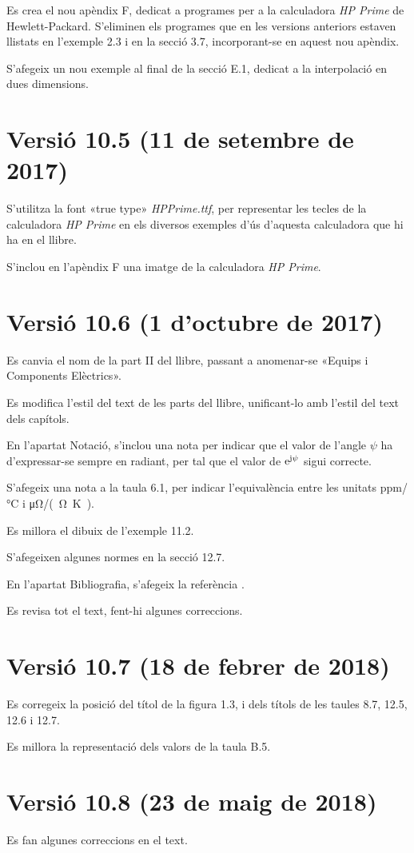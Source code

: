 Es crea el nou apèndix F, dedicat a programes per a la calculadora \emph{HP Prime} de Hewlett-Packard. S'eliminen els programes que en les versions anteriors estaven llistats en l'exemple 2.3 i en la secció 3.7, incorporant-se en aquest nou apèndix.

S'afegeix un nou exemple al final de la secció E.1, dedicat  a la interpolació en dues dimensions.

\section*{Versió 10.5 (11 de setembre de 2017)}

S'utilitza la font «true type» \emph{HPPrime.ttf}, per representar les tecles de la calculadora \emph{HP Prime} en els diversos exemples d'ús d'aquesta calculadora que hi ha en el llibre.

S'inclou en l'apèndix F una imatge de la calculadora \emph{HP Prime}.


\section*{Versió 10.6 (1 d'octubre de 2017)}

Es canvia el nom de la part II del llibre, passant a anomenar-se «Equips i Components Elèctrics».

Es modifica l'estil del text de les parts del llibre, unificant-lo amb l'estil del text dels capítols.

En l'apartat Notació, s'inclou una nota per indicar  que el valor de l'angle $\psi$ ha d'expressar-se sempre en radiant, per tal que el valor de $\mathrm{e}^{\mathrm{j}\psi}$ sigui correcte.

S'afegeix una nota a la taula 6.1, per indicar l'equivalència entre les unitats \si{ppm/\degreeCelsius}  i  \si{\micro\ohm/(\ohm.\kelvin)}.

Es millora el dibuix de l'exemple 11.2.

S’afegeixen algunes normes en la secció 12.7.

En l'apartat Bibliografia, s'afegeix la referència \cite{BUR}.

Es revisa tot el text, fent-hi algunes correccions.


\section*{Versió 10.7 (18 de febrer de 2018)}

Es corregeix la posició del títol de la figura 1.3, i dels títols de les taules  8.7, 12.5, 12.6 i 12.7.

Es millora la representació dels valors de la taula B.5.

\section*{Versió 10.8 (23 de maig de 2018)}

Es fan algunes correccions en el text.